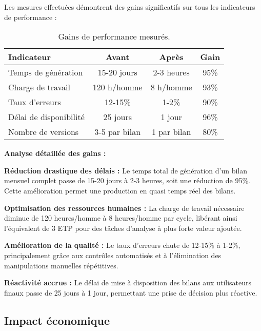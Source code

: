 Les mesures effectuées démontrent des gains significatifs sur tous les indicateurs de performance :

\begin{table}[h]
    \centering
    \begin{tabular}{|l|c|c|c|}
        \hline
        \textbf{Indicateur}    & \textbf{Avant} & \textbf{Après} & \textbf{Gain} \\ \hline
        Temps de génération    & 15-20 jours    & 2-3 heures     & 95\%          \\ \hline
        Charge de travail      & 120 h/homme    & 8 h/homme      & 93\%          \\ \hline
        Taux d'erreurs         & 12-15\%        & 1-2\%          & 90\%          \\ \hline
        Délai de disponibilité & 25 jours       & 1 jour         & 96\%          \\ \hline
        Nombre de versions     & 3-5 par bilan  & 1 par bilan    & 80\%          \\ \hline
    \end{tabular}
    \caption{Gains de performance mesurés.}
    \label{tab:gains-performance}
\end{table}

\textbf{Analyse détaillée des gains :}

\textbf{Réduction drastique des délais :} Le temps total de génération d'un bilan mensuel complet passe de 15-20 jours à 2-3 heures, soit une réduction de 95\%. Cette amélioration permet une production en quasi temps réel des bilans.

\textbf{Optimisation des ressources humaines :} La charge de travail nécessaire diminue de 120 heures/homme à 8 heures/homme par cycle, libérant ainsi l'équivalent de 3 ETP pour des tâches d'analyse à plus forte valeur ajoutée.

\textbf{Amélioration de la qualité :} Le taux d'erreurs chute de 12-15\% à 1-2\%, principalement grâce aux contrôles automatisés et à l'élimination des manipulations manuelles répétitives.

\textbf{Réactivité accrue :} Le délai de mise à disposition des bilans aux utilisateurs finaux passe de 25 jours à 1 jour, permettant une prise de décision plus réactive.

\subsection{Impact économique}

